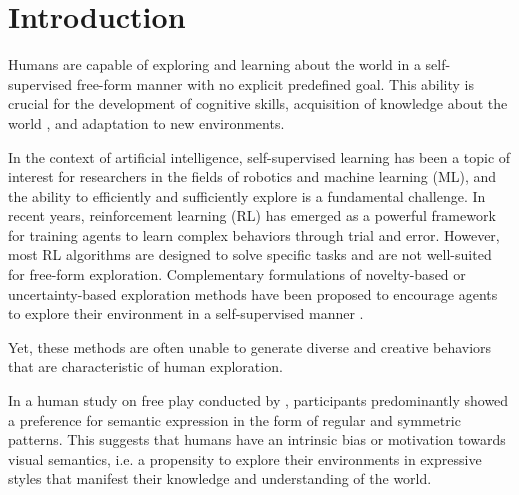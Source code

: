 \chapter{Introduction}
\label{sec:introduction}

Humans are capable of exploring and learning about the world in a self-supervised free-form manner with no explicit predefined goal. 
This ability is crucial for the development of cognitive skills, acquisition of knowledge about the world \citep{exploration,chu2020play}, and adaptation to new environments.


In the context of artificial intelligence, self-supervised learning has been a topic of interest for researchers in the fields of robotics and machine learning (ML), and the ability to efficiently and sufficiently explore is a fundamental challenge.
In recent years, reinforcement learning (RL) has emerged as a powerful framework for training agents to learn complex behaviors through trial and error.
However, most RL algorithms are designed to solve specific tasks and are not well-suited for free-form exploration.
Complementary formulations of novelty-based or uncertainty-based exploration methods have been proposed to encourage agents to explore their environment in a self-supervised manner \citep{rnd,icm,disagreement,exploration_survey}. 

Yet, these methods are often unable to generate diverse and creative behaviors that are characteristic of human exploration.

In a human study on free play conducted by \citet{diggs}, participants predominantly showed a preference for semantic expression in the form of regular and symmetric patterns.
This suggests that humans have an intrinsic bias or motivation towards visual semantics, i.e. a propensity to explore their environments in expressive styles that manifest their knowledge and understanding of the world.


